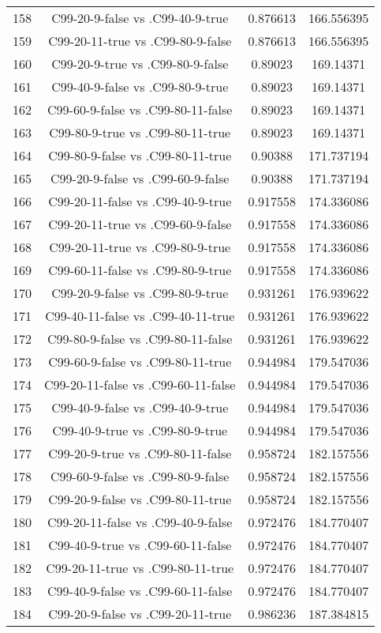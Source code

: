 \documentclass[a4paper,10pt]{article}
\begin{document}
\begin{landscape}
\begin{table}[!htp]
\begin{tabular}{cccc}
158&C99-20-9-false vs .C99-40-9-true&0.876613&166.556395\\
159&C99-20-11-true vs .C99-80-9-false&0.876613&166.556395\\
160&C99-20-9-true vs .C99-80-9-false&0.89023&169.14371\\
161&C99-40-9-false vs .C99-80-9-true&0.89023&169.14371\\
162&C99-60-9-false vs .C99-80-11-false&0.89023&169.14371\\
163&C99-80-9-true vs .C99-80-11-true&0.89023&169.14371\\
164&C99-80-9-false vs .C99-80-11-true&0.90388&171.737194\\
165&C99-20-9-false vs .C99-60-9-false&0.90388&171.737194\\
166&C99-20-11-false vs .C99-40-9-true&0.917558&174.336086\\
167&C99-20-11-true vs .C99-60-9-false&0.917558&174.336086\\
168&C99-20-11-true vs .C99-80-9-true&0.917558&174.336086\\
169&C99-60-11-false vs .C99-80-9-true&0.917558&174.336086\\
170&C99-20-9-false vs .C99-80-9-true&0.931261&176.939622\\
171&C99-40-11-false vs .C99-40-11-true&0.931261&176.939622\\
172&C99-80-9-false vs .C99-80-11-false&0.931261&176.939622\\
173&C99-60-9-false vs .C99-80-11-true&0.944984&179.547036\\
174&C99-20-11-false vs .C99-60-11-false&0.944984&179.547036\\
175&C99-40-9-false vs .C99-40-9-true&0.944984&179.547036\\
176&C99-40-9-true vs .C99-80-9-true&0.944984&179.547036\\
177&C99-20-9-true vs .C99-80-11-false&0.958724&182.157556\\
178&C99-60-9-false vs .C99-80-9-false&0.958724&182.157556\\
179&C99-20-9-false vs .C99-80-11-true&0.958724&182.157556\\
180&C99-20-11-false vs .C99-40-9-false&0.972476&184.770407\\
181&C99-40-9-true vs .C99-60-11-false&0.972476&184.770407\\
182&C99-20-11-true vs .C99-80-11-true&0.972476&184.770407\\
183&C99-40-9-false vs .C99-60-11-false&0.972476&184.770407\\
184&C99-20-9-false vs .C99-20-11-true&0.986236&187.384815\\

\end{tabular}
\end{table}
\end{landscape}
\end{document}
